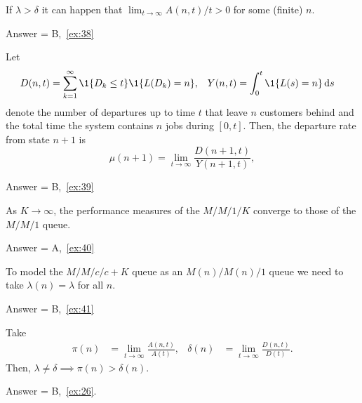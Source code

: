 \begin{exercise}[201904]
If $\lambda>\delta$ it can happen that  $ \lim_{t\to\infty} A(n,t)/t > 0$ for some (finite) $n$. 
\begin{solution} Answer = B,~\cref{ex:38}
\end{solution}
\end{exercise}

\begin{exercise}[201904]
Let
\begin{align*}
    D(n,t) &= \sum_{k=1}^\infty \1{D_k \leq t} \1{L(D_k) = n}, &    Y(n,t) &= \int_0^t  \1{L(s) = n} \d s
  \end{align*}
  denote the number of departures up to time $t$ that leave $n$ customers behind and the total time the system contains $n$ jobs during $[0,t]$.
  Then, the departure rate from state $n+1$ is
\begin{equation*}
  \mu(n+1) = \lim_{t\to\infty} \frac{D(n+1,t)}{Y(n+1,t)},
\end{equation*}
\begin{solution} Answer = B,~\cref{ex:39}
\end{solution}
\end{exercise}



\begin{exercise}[201904] 
As $K\to\infty$, the performance measures of the $M/M/1/K$ converge to those of the $M/M/1$ queue. 
\begin{solution} Answer = A,~\cref{ex:40}
\end{solution}
\end{exercise}


\begin{exercise}[201904] 
To model the  $M/M/c/c+K$ queue as an $M(n)/M(n)/1$ queue we need to take $\lambda(n) = \lambda$ for all $n$.
\begin{solution} Answer = B,~\cref{ex:41}
\end{solution}
\end{exercise}

\newpage

\begin{exercise}[201904]
  Take
  \begin{align*}
    \pi(n) &= \lim_{t\to\infty} \frac{A(n,t)}{A(t)}, & 
    \delta(n) &= \lim_{t\to\infty} \frac{D(n,t)}{D(t)}. 
  \end{align*}
  Then, $\lambda\neq \delta \implies \pi(n) > \delta(n)$.
\begin{solution} Answer = B,~\cref{ex:26}.
\end{solution}
\end{exercise}

